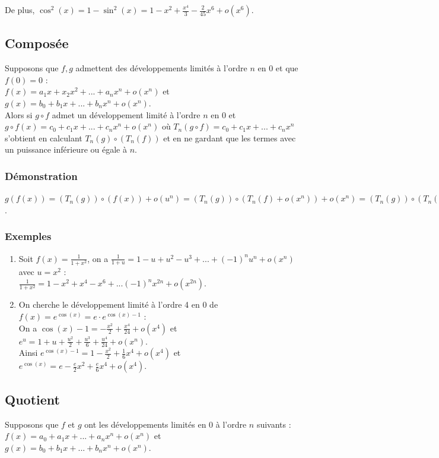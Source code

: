 \documentclass[a4paper,10pt]{book} %
\newcommand{\dl}{développement limité }
\newcommand{\dls}{développements limités }
\begin{document}
De plus, $\cos^2(x)=1-\sin^2(x)=1-x^2+\frac{x^4}{3}-\frac{2}{45}x^6+o(x^6)$.

\subsection{Composée}
Supposons que $f,g$ admettent des \dls à l'ordre $n$ en 0 et que $f(0)=0$ :\\
$f(x)=a_1x+x_2x^2+...+a_nx^n+o(x^n)$ et $g(x)=b_0+b_1x+...+b_nx^n+o(x^n)$.\\

Alors si $g\circ f$ admet un \dl à l'ordre $n$ en 0 et \\
$g\circ f(x)=c_0+c_1x+...+c_nx^n+o(x^n)$ où $T_n(g\circ f)=c_0+c_1x+...+c_nx^n$ s'obtient en calculant $T_n(g)\circ(T_n(f))$ et en ne gardant que les termes avec un puissance inférieure ou égale à $n$.

\subsubsection{Démonstration}
$g(f(x))=(T_n(g))\circ(f(x))+o(u^n)=(T_n(g))\circ(T_n(f)+o(x^n))+o(x^n)=(T_n(g))\circ(T_n(f))+o(x^n)$.

\subsubsection{Exemples}
\begin{enumerate}
\item Soit $f(x)=\frac{1}{1+x^2}$, on a $\frac{1}{1+u}=1-u+u^2-u^3+...+(-1)^nu^n+o(x^n)$ avec $u=x^2$ :\\ $\frac{1}{1+x^2}=1-x^2+x^4-x^6+...(-1)^nx^{2n}+o(x^{2n})$.

\item On cherche le \dl à l'ordre 4 en 0 de $f(x)=e^{\cos(x)}=e\cdot e^{\cos(x)-1}$ :\\
On a $\cos(x)-1=-\frac{x^2}{2}+\frac{x^4}{24}+o(x^4)$ et $e^u=1+u+\frac{u^2}{2}+\frac{u^3}{6}+\frac{u^4}{24}+o(x^n)$.\\
Ainsi $e^{\cos(x)-1}=1-\frac{x^2}{2}+\frac{1}{6}x^4+o(x^4)$ et $e^{\cos(x)}=e-\frac{e}{2}x^2+\frac{e}{6}x^4+o(x^4)$.
\end{enumerate}

\newpage

\subsection{Quotient}
Supposons que $f$ et $g$ ont les \dls en 0 à l'ordre $n$ suivants :\\
$f(x)=a_0+a_1x+...+a_nx^n+o(x^n)$ et $g(x)=b_0+b_1x+...+b_nx^n+o(x^n)$.\\
\end{document}
